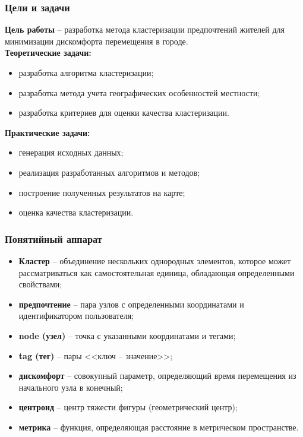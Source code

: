 \begin{frame} %
    \frametitle{Цели и задачи}
    \textbf{Цель работы} -- разработка метода кластеризации предпочтений
    жителей для минимизации дискомфорта перемещения в городе.\\
    \textbf{Теоретические задачи:}
    \begin{itemize}
        \item разработка алгоритма кластеризации;
        \item разработка метода учета географических особенностей местности;
        \item разработка критериев для оценки качества кластеризации.
    \end{itemize}
    \textbf{Практические задачи:}
    \begin{itemize}
        \item генерация исходных данных;
        \item реализация разработанных алгоритмов и методов;
        \item построение полученных результатов на карте;
        \item оценка качества кластеризации.
    \end{itemize}
\end{frame}

\begin{frame} %
    \frametitle{Понятийный аппарат}
    \small
    \begin{itemize}
      \itemsep-5pt
        \item \textbf{Кластер} -- объединение нескольких однородных элементов,
          которое может рассматриваться как самостоятельная единица, обладающая
          определенными свойствами;
        \item \textbf{предпочтение} -- пара узлов с определенными координатами
          и идентификатором пользователя;
        \item \textbf{node (узел)} -- точка с указанными координатами и тегами;
        \item \textbf{tag (тег)} -- пары <<ключ -- значение>>;
        \item \textbf{дискомфорт} -- совокупный параметр, определяющий время
          перемещения из начального узла в конечный;
        \item \textbf{центроид} -- центр тяжести фигуры (геометрический центр);
        \item \textbf{метрика} -- функция, определяющая расстояние в
          метрическом пространстве.
    \end{itemize}
\end{frame}

